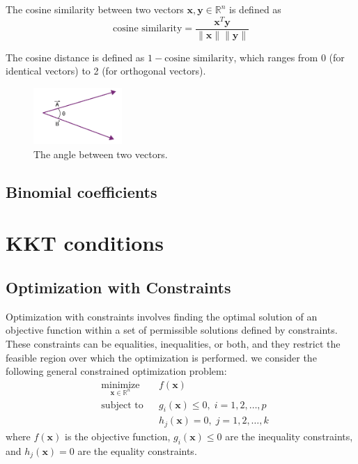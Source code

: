 \documentclass[11pt]{book} %
\begin{document}
The cosine similarity between two vectors $\mathbf{x}, \mathbf{y} \in \mathbb{R}^n$ is defined as \\
\begin{equation}
    \text{cosine similarity} = \frac{\mathbf{x}^T \mathbf{y}}{\lVert \mathbf{x} \rVert \lVert \mathbf{y} \rVert}
\end{equation}

The cosine distance is defined as $1 - \text{cosine similarity}$, which ranges from 0 (for identical vectors) to 2 (for orthogonal vectors).

\begin{figure}[h]
    \centering
    \includegraphics[width=0.3\textwidth]{Figs/angle_between_vectors.png}
    \caption{The angle between two vectors.}
    \label{fig:cosine_similarity}
\end{figure}

\subsection{Binomial coefficients}

%
%
%

\section{KKT conditions}
\subsection{Optimization with Constraints}

Optimization with constraints involves finding the optimal solution of an objective function within a set of permissible solutions defined by constraints. These constraints can be equalities, inequalities, or both, and they restrict the feasible region over which the optimization is performed.
we consider the following general constrained optimization problem:
\begin{equation}
\begin{aligned}
& \underset{\mathbf{x} \in \mathbb{R}^n }{\text{minimize}}
& & f(\mathbf{x}) \\
& \text{subject to}
& & g_i(\mathbf{x}) \leq 0, \; i = 1, 2, \ldots, p \\
&&& h_j(\mathbf{x}) = 0, \; j = 1, 2, \ldots, k
\end{aligned}
\end{equation}
where \(f(\mathbf{x})\) is the objective function, \(g_i(\mathbf{x}) \leq 0\) are the inequality constraints, and \(h_j(\mathbf{x}) = 0\) are the equality constraints.
\end{document}
